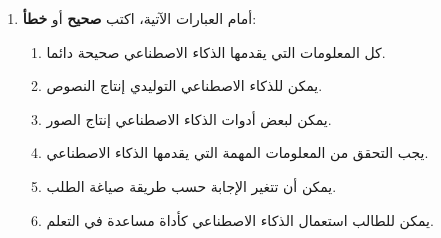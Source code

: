 \documentclass[a4paper]{article}
\begin{document}
\begin{enumerate}

\item أمام العبارات الآتية، اكتب
\textbf{صحيح} أو \textbf{خطأ}:

\begin{enumerate}

    \item كل المعلومات التي يقدمها الذكاء الاصطناعي
    صحيحة دائما.

    \item يمكن للذكاء الاصطناعي التوليدي إنتاج النصوص.

    \item يمكن لبعض أدوات الذكاء الاصطناعي إنتاج الصور.

    \item يجب التحقق من المعلومات المهمة التي يقدمها
    الذكاء الاصطناعي.

    \item يمكن أن تتغير الإجابة حسب طريقة صياغة الطلب.

    \item يمكن للطالب استعمال الذكاء الاصطناعي كأداة
    مساعدة في التعلم.

\end{enumerate}

\end{enumerate}
\end{document}
